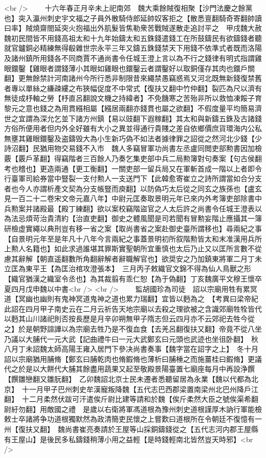 <br />
　　十六年春正月辛未上祀南郊　魏大乘餘賊復相聚【沙門法慶之餘黨也】突入瀛州刺史宇文福之子員外散騎侍郎延帥奴客拒之【散悉亶翻騎奇寄翻帥讀曰率】賊燒齋閤延突火抱福出外肌髮皆焦勒衆苦戰賊遂散走追討平之　甲戌魏大赦　魏初民間皆不用錢高祖太和十九年始鑄太和五銖錢遣錢工在所鼓鑄民有欲鑄錢者聽就官鑪銅必精練無得殽雜世宗永平三年又鑄五銖錢禁天下用錢不依準式者既而洛陽及諸州鎮所用錢各不同商賈不通尚書令任城王澄上言以為不行之錢律有明式指謂雞眼鐶鑿【雞眼者謂錢薄小其眼如雞眼也鐶鑿云者謂鑿好以取銅僅存其肉也鐶戶關翻】更無餘禁計河南諸州今所行悉非制限昔來繩禁愚竊惑焉又河北既無新錢復禁舊者專以單絲之縑疎縷之布狹幅促度不中常式【復扶又翻中竹仲翻】裂匹為尺以濟有無徒成杼軸之勞【杼直呂翻說文機之持緯者】不免饑寒之苦殆非所以救恤凍餒子育黎元之意也錢之為用貫繦相屬【繦居兩翻亦錢貫也屬之欲翻】不假度量平均簡易濟世之宜謂為深允乞並下諸方州鎮【易以豉翻下遐稼翻】其太和與新鑄五銖及古諸錢方俗所便用者但内外全好雖有大小之異並得通行貴賤之差自依鄉價庶貨環海内公私無壅其雞眼鐶鑿及盗鑄毁大為小生新巧偽不如法者據律罪之詔從之然河北少錢【少詩沼翻】民猶用物交易錢不入市　魏人多竊冒軍功尚書左丞盧同閲吏部勲書因加檢覈【覈戶革翻】得竊階者三百餘人乃奏乞集吏部中兵二局勲簿對句奏案【句古侯翻考也稽也】更造兩通【更工衡翻】一關吏部一留兵局又在軍斬首成一階以上者即令行臺軍司給券當中豎裂一支付勲人一支送門下【此韓愈寄崔立之詩所謂當如合分支者也今人亦謂析產文契為分支帳豎而庾翻】以防偽巧太后從之同玄之族孫也【盧玄見一百二十二卷宋文帝元嘉八年】中尉元匡奏取景明元年已來内外考簿吏部除書中兵勲案并諸殿最【殿丁練翻】欲以案校竊階盜官之人太后許之尚書令任城王澄表以為法忌煩苛治貴清約【治直吏翻】御史之體風聞是司若聞有冒勲妄階止應攝其一簿研檢虚實繩以典刑豈有移一省之案【取尚書省之案赴御史臺所謂移也】尋兩紀之事【自景明元年至是年凡十八年今言兩紀之事蓋景明初所叙階勲皆太和末准漢用兵所上勲人名籍也】如此求過誰堪其罪斯實聖朝所宜重慎也太后乃止又以匡所言數不從慮其辭解【朝直遥翻數所角翻辭解者辭職解官也】欲奨安之乃加鎮東將軍二月丁未立匡為東平王【為匡治棺攻澄張本】　三月丙子敕織官文錦不得為仙人鳥獸之形【織官猶漢之織室令丞也】為其裁翦有乖仁恕【為于偽翻】丁亥魏廣平文穆王懷卒　夏四月戊申魏以中書<br />
<br />
　　監胡國珍為司徒　詔以宗廟用牲有累冥道【冥幽也幽則有鬼神冥道鬼神之道也累力瑞翻】宜皆以麪為之　【考異曰梁帝紀此詔在四月甲子南史云在二月云祈告天地宗廟以去殺之理欲被之含識郊廟牲牷皆代以麪其山川諸祀則否按長歷是月辛卯朔無甲子隋志但云四月亦不云郊祀去牲今從之】於是朝野諠譁以為宗廟去牲乃是不復血食【去羌呂翻復扶又翻】帝竟不從八坐乃議以大脯代一元大武【記曲禮牛曰一元大武鄭玄曰元頭也武迹也坐徂卧翻】　秋八月丁未詔魏太師高陽王雍入居門下參决尚書奏事【魏字當在詔字之上】　冬十月詔以宗廟猶用脯脩【鄭玄曰脯乾肉也脩鍜脩也薄析曰脯棰之而施薑桂曰鍜脩】更議代之於是以大餅代大脯其餘盡用蔬果又起至敬殿景陽臺置七廟座每月中再設浄饌【饌雛戀翻又雛朊翻】　乙卯魏詔北京士民未遷者悉聽留居為永業【魏以代都為北京】　十一月甲子巴州刺史牟漢寵叛降魏【五代志巴西郡梁置南梁州北巴州降戶江翻】　十二月柔然伏跋可汗遣俟斤尉比建等請和於魏【俟斤柔然大臣之號俟渠希翻尉紆勿翻】用敵國之禮　是歲以右衛將軍馮道根為豫州刺史道根謹厚木訥行軍能檢敕士卒諸將争功道根獨默然為政清簡吏民懷之上嘗歎曰道根所在令朝廷不復憶有一州【復扶又翻】　魏尚書崔亮奏請於王屋等山採銅鑄錢從之【五代志河内郡王屋縣有王屋山】是後民多私鑄錢稍薄小用之益輕【是時錢輕南北皆然豈天時邪】<br />
